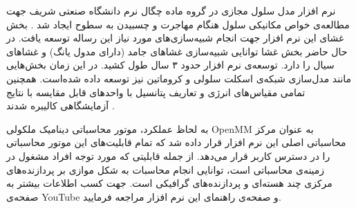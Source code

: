 نرم افزار مدل سلول مجازی
در گروه ماده چگال نرم دانشگاه صنعتی شریف جهت مطالعه‌ی خواص مکانیکی سلول هنگام مهاجرت
و چسبیدن به سطوح
ایجاد شد
\cite{Tiam2017ACS, Tiam2018AFM}.
 بخش غشای‌ این نرم افزار جهت انجام شبیه‌سازی‌های مورد نیاز این رساله توسعه یافت. در حال حاضر بخش غشا توانایی شبیه‌سازی غشا‌های جامد (دارای مدول یانگ) و غشاهای سیال را دارد. توسعه‌‌ی نرم افزار حدود ۳ سال طول کشید. در این زمان بخش‌هایی مانند مدل‌سازی شبکه‌ی اسکلت سلولی و کروماتین نیز توسعه داده شده‌است. همچنین تمامی مقیاس‌های انرژی و تعاریف پتانسیل با واحد‌های قابل مقایسه با نتایج آزمایشگاهی کالیبره شدند
\cite{VCMgit}.

به لحاظ عملکرد، موتور محاسباتی دینامیک ملکولی 
OpenMM
به عنوان مرکز محاسباتی اصلی این نرم افزار قرار داده شد که تمام قابلیت‌های این موتور محاسباتی را در دسترس کاربر قرار می‌دهد. از جمله قابلیتی که مورد توجه افراد مشغول در زمینه‌ی محاسباتی است، توانایی انجام محاسبات به شکل موازی بر پردازنده‌های مرکزی چند هسته‌ای
و پردازنده‌های گرافیکی
است. جهت کسب اطلاعات بیشتر به صفحه‌ی 
YouTube \cite{VCMYoutube}
و صفحه‌ی راهنمای این نرم افزار 
\cite{VCMhomepage}
مراجعه فرمایید.